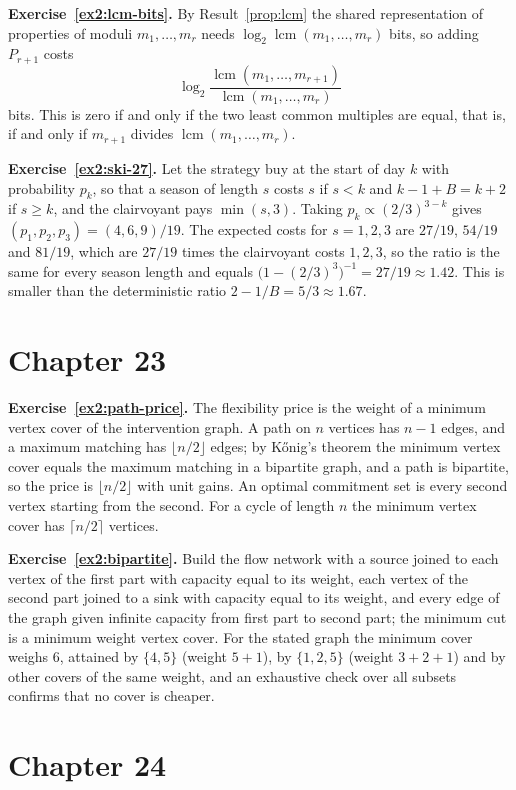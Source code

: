 \textbf{Exercise~\ref{ex2:lcm-bits}.} By Result~\ref{prop:lcm} the shared representation of properties of moduli $m_1,\dots,m_r$ needs $\log_2\operatorname{lcm}(m_1,\dots,m_r)$ bits, so adding $P_{r+1}$ costs
\[
\log_2\frac{\operatorname{lcm}(m_1,\dots,m_{r+1})}{\operatorname{lcm}(m_1,\dots,m_r)}
\]
bits. This is zero if and only if the two least common multiples are equal, that is, if and only if $m_{r+1}$ divides $\operatorname{lcm}(m_1,\dots,m_r)$.

\textbf{Exercise~\ref{ex2:ski-27}.} Let the strategy buy at the start of day $k$ with probability $p_k$, so that a season of length $s$ costs $s$ if $s<k$ and $k-1+B=k+2$ if $s\ge k$, and the clairvoyant pays $\min(s,3)$. Taking $p_k\propto(2/3)^{3-k}$ gives $(p_1,p_2,p_3)=(4,6,9)/19$. The expected costs for $s=1,2,3$ are $27/19$, $54/19$ and $81/19$, which are $27/19$ times the clairvoyant costs $1,2,3$, so the ratio is the same for every season length and equals $\bigl(1-(2/3)^{3}\bigr)^{-1}=27/19\approx1.42$. This is smaller than the deterministic ratio $2-1/B=5/3\approx1.67$.

\section*{Chapter 23}

\textbf{Exercise~\ref{ex2:path-price}.} The flexibility price is the weight of a minimum vertex cover of the intervention graph. A path on $n$ vertices has $n-1$ edges, and a maximum matching has $\lfloor n/2\rfloor$ edges; by K\H{o}nig's theorem the minimum vertex cover equals the maximum matching in a bipartite graph, and a path is bipartite, so the price is $\lfloor n/2\rfloor$ with unit gains. An optimal commitment set is every second vertex starting from the second. For a cycle of length $n$ the minimum vertex cover has $\lceil n/2\rceil$ vertices.

\textbf{Exercise~\ref{ex2:bipartite}.} Build the flow network with a source joined to each vertex of the first part with capacity equal to its weight, each vertex of the second part joined to a sink with capacity equal to its weight, and every edge of the graph given infinite capacity from first part to second part; the minimum cut is a minimum weight vertex cover. For the stated graph the minimum cover weighs $6$, attained by $\{4,5\}$ (weight $5+1$), by $\{1,2,5\}$ (weight $3+2+1$) and by other covers of the same weight, and an exhaustive check over all subsets confirms that no cover is cheaper.

\section*{Chapter 24}

